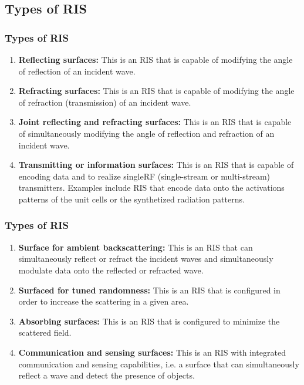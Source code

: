 \documentclass{beamer}
\let\olditem\item
\renewcommand\item{\olditem\justifying}
\newcommand{\mypause}{\pause}
\begin{document}
\subsection{Types of RIS}
\begin{frame}
	\frametitle{Types of RIS}
	\begin{enumerate}\addtocounter{enumi}{0}
		\mypause
		\item \textbf{Reflecting surfaces:} This is an RIS that is capable of modifying the angle of reflection of an incident wave.
		\mypause
		\item \textbf{Refracting surfaces:} This is an RIS that is capable of modifying the angle of refraction (transmission) of an
		incident wave.
		\mypause
		\item \textbf{Joint reflecting and refracting surfaces:} This is an RIS that is capable of simultaneously modifying the
		angle of reflection and refraction of an incident wave.
		\mypause
		\item \textbf{Transmitting or information surfaces:} This is an RIS that is capable of encoding data and to realize singleRF (single-stream or multi-stream) transmitters. Examples include RIS that encode data onto the activations
		patterns of the unit cells or the synthetized radiation patterns.
	\end{enumerate}
\end{frame}

\begin{frame}
	\frametitle{Types of RIS}
	\begin{enumerate}\addtocounter{enumi}{4}
		\item \textbf{Surface for ambient backscattering:} This is an RIS that can simultaneously reflect or refract the incident
		waves and simultaneously modulate data onto the reflected or refracted wave.
		\mypause
		\item \textbf{Surfaced for tuned randomness:} This is an RIS that is configured in order to increase the scattering in a
		given area.
		\mypause
		\item \textbf{Absorbing surfaces:} This is an RIS that is configured to minimize the scattered field.
		\mypause
		\item \textbf{Communication and sensing surfaces:} This is an RIS with integrated communication and sensing capabilities, i.e. a surface that can simultaneously reflect a wave and detect the presence of objects.
	\end{enumerate}
\end{frame}
\end{document}
